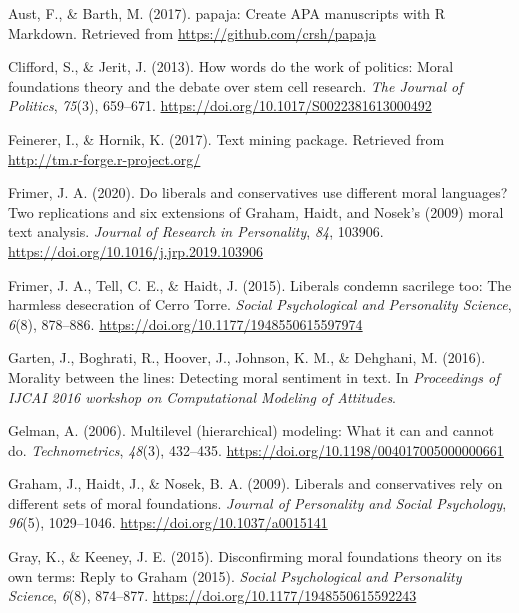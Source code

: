 \documentclass[
  english,
  man,floatsintext]{apa6}
\newlength{\cslhangindent}
\newlength{\cslentryspacingunit} %
\newenvironment{CSLReferences}[2] %
 {%
  \setlength{\parindent}{0pt}
  \ifodd #1
  \let\oldpar\par
  \def\par{\hangindent=\cslhangindent\oldpar}
  \fi
  \setlength{\parskip}{#2\cslentryspacingunit}
 }%
 {}
\begin{document}
\hypertarget{refs}{}
\begin{CSLReferences}{1}{0}
\leavevmode{}%
Aust, F., \& Barth, M. (2017). {papaja: Create APA manuscripts with R Markdown.} Retrieved from \url{https://github.com/crsh/papaja}

\leavevmode{}%
Clifford, S., \& Jerit, J. (2013). How words do the work of politics: Moral foundations theory and the debate over stem cell research. \emph{The Journal of Politics}, \emph{75}(3), 659--671. \url{https://doi.org/10.1017/S0022381613000492}

\leavevmode{}%
Feinerer, I., \& Hornik, K. (2017). {Text mining package}. Retrieved from \url{http://tm.r-forge.r-project.org/}

\leavevmode{}%
Frimer, J. A. (2020). Do liberals and conservatives use different moral languages? Two replications and six extensions of {G}raham, {H}aidt, and {N}osek's (2009) moral text analysis. \emph{Journal of Research in Personality}, \emph{84}, 103906. \url{https://doi.org/10.1016/j.jrp.2019.103906}

\leavevmode{}%
Frimer, J. A., Tell, C. E., \& Haidt, J. (2015). Liberals condemn sacrilege too: The harmless desecration of {C}erro {T}orre. \emph{Social Psychological and Personality Science}, \emph{6}(8), 878--886. \url{https://doi.org/10.1177/1948550615597974}

\leavevmode{}%
Garten, J., Boghrati, R., Hoover, J., Johnson, K. M., \& Dehghani, M. (2016). Morality between the lines: Detecting moral sentiment in text. In \emph{{Proceedings of IJCAI 2016 workshop on Computational Modeling of Attitudes}}.

\leavevmode{}%
Gelman, A. (2006). {Multilevel (hierarchical) modeling: What it can and cannot do}. \emph{Technometrics}, \emph{48}(3), 432--435. \url{https://doi.org/10.1198/004017005000000661}

\leavevmode{}%
Graham, J., Haidt, J., \& Nosek, B. A. (2009). {Liberals and conservatives rely on different sets of moral foundations.} \emph{Journal of Personality and Social Psychology}, \emph{96}(5), 1029--1046. \url{https://doi.org/10.1037/a0015141}

\leavevmode{}%
Gray, K., \& Keeney, J. E. (2015). Disconfirming moral foundations theory on its own terms: Reply to {G}raham (2015). \emph{Social Psychological and Personality Science}, \emph{6}(8), 874--877. \url{https://doi.org/10.1177/1948550615592243}


\end{CSLReferences}
\end{document}
